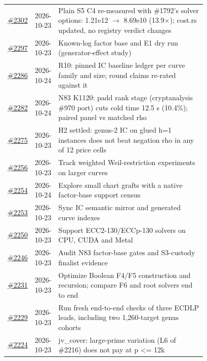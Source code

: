 {\begin{longtable}{@{}r l >{\raggedright\arraybackslash}p{0.78\linewidth}@{}}
\href{https://github.com/aburan28/crypto/pull/2302}{\#2302} & 2026-10-23 & Plain S5 C4 re-measured with \#1792's solver options: 1.21e12 $\to$ 8.69e10 (13.9$\times$); cost.rs updated, no registry verdict changes\\
\href{https://github.com/aburan28/crypto/pull/2297}{\#2297} & 2026-10-23 & Known-log factor base and E1 dry run (generator-effect study)\\
\href{https://github.com/aburan28/crypto/pull/2286}{\#2286} & 2026-10-24 & R10: pinned IC baseline ledger per curve family and size; round claims re-rated against it\\
\href{https://github.com/aburan28/crypto/pull/2282}{\#2282} & 2026-10-24 & N83 K1120: padd rank stage (cryptanalysis \#970 port) cuts cold time 12.5 s (10.4\%); paired panel vs matched rho\\
\href{https://github.com/aburan28/crypto/pull/2275}{\#2275} & 2026-10-23 & H2 settled: genus-2 IC on glued h=1 instances does not beat negation rho in any of 12 price cells\\
\href{https://github.com/aburan28/crypto/pull/2256}{\#2256} & 2026-10-23 & Track weighted Weil-restriction experiments on larger curves\\
\href{https://github.com/aburan28/crypto/pull/2254}{\#2254} & 2026-10-24 & Explore small chart grafts with a native factor-base support census\\
\href{https://github.com/aburan28/crypto/pull/2253}{\#2253} & 2026-10-23 & Sync IC semantic mirror and generated curve indexes\\
\href{https://github.com/aburan28/crypto/pull/2250}{\#2250} & 2026-10-23 & Support ECC2-130/\allowbreak{}ECCp-130 solvers on CPU, CUDA and Metal\\
\href{https://github.com/aburan28/crypto/pull/2246}{\#2246} & 2026-10-23 & Audit N83 factor-base gates and S3-custody finalist evidence\\
\href{https://github.com/aburan28/crypto/pull/2231}{\#2231} & 2026-10-23 & Optimize Boolean F4/\allowbreak{}F5 construction and recursion; compare F6 and root solvers end to end\\
\href{https://github.com/aburan28/crypto/pull/2229}{\#2229} & 2026-10-23 & Run fresh end-to-end checks of three ECDLP leads, including two 1,260-target genus cohorts\\
\href{https://github.com/aburan28/crypto/pull/2224}{\#2224} & 2026-10-23 & jv\_\allowbreak{}cover: large-prime variation (L6 of \#2216) does not pay at p \textless{}= 12k\\

\end{longtable}}
